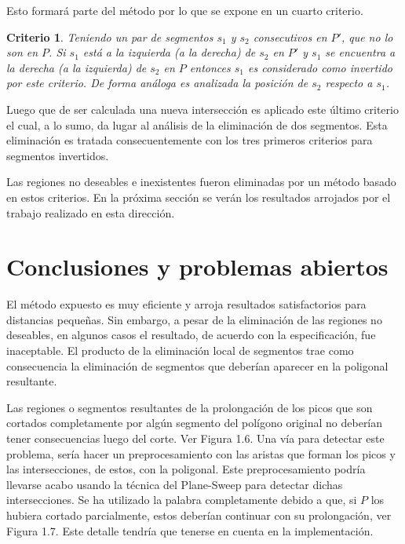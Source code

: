 \documentclass[12pt,english]{report}
\newtheorem{claim}{Criterio}[section]
\begin{document}
Esto formar\'a parte del m\'etodo por lo que se expone en un cuarto criterio.  

\begin{claim}
Teniendo un par de segmentos $s_1$ y $s_2$ consecutivos en $P'$, que no lo son en $P$. Si $s_1$ est\'a a la izquierda (a la derecha) de $s_2$ en $P'$ y $s_1$ se encuentra a la derecha (a la izquierda) de $s_2$ en $P$ entonces $s_1$ es considerado como invertido por este criterio. De forma an\'aloga es analizada la posici\'on de $s_2$ respecto a $s_1$.
\end{claim} 

Luego que de ser calculada una nueva intersecci\'on es aplicado este \'ultimo criterio el cual, a lo sumo, da lugar al an\'alisis de la eliminaci\'on de dos segmentos. Esta eliminaci\'on es tratada consecuentemente con los tres primeros  criterios para segmentos invertidos.
 
Las regiones no deseables e inexistentes fueron eliminadas por un m\'etodo basado en estos criterios. En la pr\'oxima secci\'on se ver\'an los resultados arrojados por el trabajo realizado en esta direcci\'on.  

\section{Conclusiones y problemas abiertos}

El m\'etodo expuesto es muy eficiente y arroja resultados satisfactorios para distancias peque\~nas. Sin embargo, a pesar de la eliminaci\'on de las regiones no deseables, en algunos casos el resultado, de acuerdo con la especificaci\'on, fue inaceptable. El producto de la eliminaci\'on local de segmentos trae como consecuencia la eliminaci\'on de segmentos que deber\'ian aparecer en la poligonal resultante.

Las regiones o segmentos resultantes de la prolongaci\'on de los picos que son cortados completamente por alg\'un segmento del  pol\'igono original no deber\'ian tener consecuencias luego del corte. Ver Figura 1.6. Una v\'ia para detectar este problema, ser\'ia hacer un preprocesamiento con las aristas que forman los picos y las intersecciones, de estos, con la poligonal. Este preprocesamiento podr\'ia llevarse acabo usando la t\'ecnica del Plane-Sweep para detectar dichas intersecciones. Se ha utilizado la palabra completamente debido a que, si $P$ los hubiera cortado parcialmente, estos deber\'ian continuar con su prolongaci\'on, ver Figura 1.7. Este detalle tendr\'ia que tenerse en cuenta en la implementaci\'on. 
\end{document}
